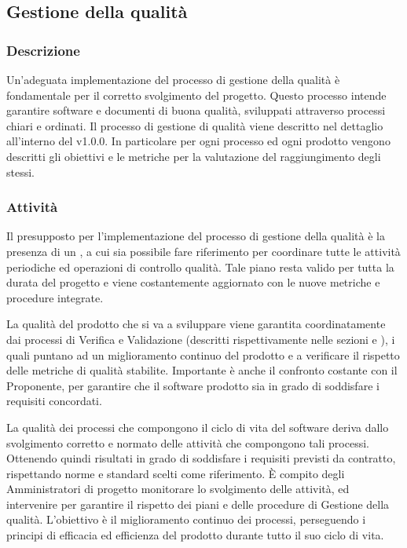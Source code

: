 \subsection{Gestione della qualità}
    \subsubsection{Descrizione}
      Un'adeguata implementazione del processo di gestione della qualità è fondamentale per il corretto svolgimento del progetto. Questo processo intende garantire software e documenti di buona qualità, sviluppati attraverso processi chiari e ordinati. Il processo di gestione di qualità viene descritto nel dettaglio all'interno del \PdQ{} v1.0.0. In particolare per ogni processo ed ogni prodotto vengono descritti gli obiettivi e le metriche per la valutazione del raggiungimento degli stessi.
      
    \subsubsection{Attività}
       Il presupposto per l'implementazione del processo di gestione della qualità è la presenza di un \PdQ{}, a cui sia possibile fare riferimento per coordinare tutte le attività periodiche ed operazioni di controllo qualità. Tale piano resta valido per tutta la durata del progetto e viene costantemente aggiornato con le nuove metriche e procedure integrate.

      La qualità del prodotto che si va a sviluppare viene garantita coordinatamente dai processi di Verifica e Validazione (descritti rispettivamente nelle sezioni  e ), i quali puntano ad un miglioramento continuo del prodotto e a verificare il rispetto delle metriche di qualità stabilite. Importante è anche il confronto costante con il Proponente, per garantire che il software prodotto sia in grado di soddisfare i requisiti concordati.

      La qualità dei processi che compongono il ciclo di vita del software deriva dallo svolgimento corretto e normato delle attività che compongono tali processi. Ottenendo quindi risultati in grado di soddisfare i requisiti previsti da contratto, rispettando norme e standard scelti come riferimento. È compito degli Amministratori di progetto monitorare lo svolgimento delle attività, ed intervenire per garantire il rispetto dei piani e delle procedure di Gestione della qualità.
      L'obiettivo è il miglioramento continuo dei processi, perseguendo i principi di efficacia ed efficienza del prodotto durante tutto il suo ciclo di vita.   

